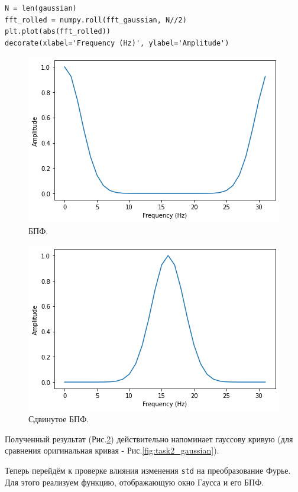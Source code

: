 \documentclass[a4paper, 14pt]{extarticle}
\begin{document}
    \begin{lstlisting}[caption= Сдвиг отрицательных частот., label={lst:task2_rolled}]
N = len(gaussian)
fft_rolled = numpy.roll(fft_gaussian, N//2)
plt.plot(abs(fft_rolled))
decorate(xlabel='Frequency (Hz)', ylabel='Amplitude')   \end{lstlisting}

    \begin{figure}[H]
        \centering
        \includegraphics[width=0.8\linewidth]{resources/Images/task2_fft}
        \caption{БПФ.}
        \label{fig:task2_fft}
    \end{figure}

    \begin{figure}[H]
        \centering
        \includegraphics[width=0.8\linewidth]{resources/Images/task2_rolled}
        \caption{Сдвинутое БПФ.}
        \label{fig:task2_rolled}
    \end{figure}

    Полученный результат (Рис.\ref{fig:task2_rolled}) действительно напоминает гауссову кривую (для сравнения
    оригинальная кривая - Рис.\ref{fig:task2_gaussian}).

    Теперь перейдём к проверке влияния изменения \texttt{std} на преобразование Фурье. Для этого реализуем функцию,
    отображающую окно Гаусса и его БПФ.
\end{document}
